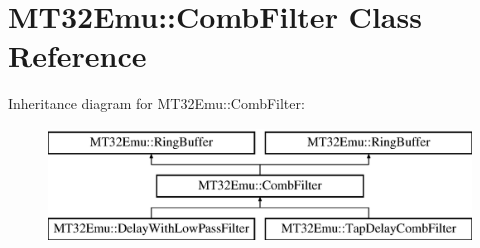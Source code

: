 \hypertarget{classMT32Emu_1_1CombFilter}{\section{M\-T32\-Emu\-:\-:Comb\-Filter Class Reference}
\label{classMT32Emu_1_1CombFilter}
}
Inheritance diagram for M\-T32\-Emu\-:\-:Comb\-Filter\-:\begin{figure}[H]
\begin{center}
\leavevmode
\includegraphics[height=3.000000cm]{classMT32Emu_1_1CombFilter}
\end{center}
\end{figure}
